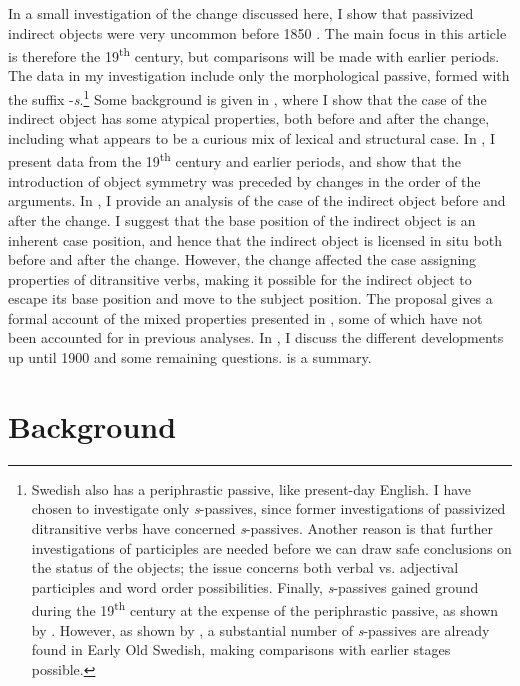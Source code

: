 \documentclass[output=paper]{langscibook}
\begin{document}
In a small investigation of the change discussed here, I show that passivized indirect objects were very uncommon before 1850 \citep[167]{Falk1997}. The main focus in this article is therefore the 19\textsuperscript{th} century, but comparisons will be made with earlier periods. The data in my investigation include only the morphological passive, formed with the suffix -\textit{s}.\footnote{Swedish also has a periphrastic passive, like present-day English. I have chosen to investigate only \textit{s}{}-passives, since former investigations of passivized ditransitive verbs have concerned \textit{s}{}-passives. Another reason is that further investigations of participles are needed before we can draw safe conclusions on the status of the objects; the issue concerns both verbal vs. adjectival participles and word order possibilities. Finally, \textit{s}{}-passives gained ground during the 19\textsuperscript{th} century at the expense of the periphrastic passive, as shown by \citet{Kirri1975}. However, as shown by \citet{Holm1952}, a substantial number of \textit{s}{}-passives are already found in Early Old Swedish, making comparisons with earlier stages possible.} Some background is given in , where I show that the case of the indirect object has some atypical properties, both before and after the change, including what appears to be a curious mix of lexical and structural case. In , I present data from the 19\textsuperscript{th} century and earlier periods, and show that the introduction of object symmetry was preceded by changes in the order of the arguments. In , I provide an analysis of the case of the indirect object before and after the change. I suggest that the base position of the indirect object is an inherent case position, and hence that the indirect object is licensed in situ both before and after the change. However, the change affected the case assigning properties of ditransitive verbs, making it possible for the indirect object to escape its base position and move to the subject position. The proposal gives a formal account of the mixed properties presented in , some of which have not been accounted for in previous analyses. In , I discuss the different developments up until 1900 and some remaining questions.  is a summary.

\section{Background}\label{sec:falk:2}
\end{document}
